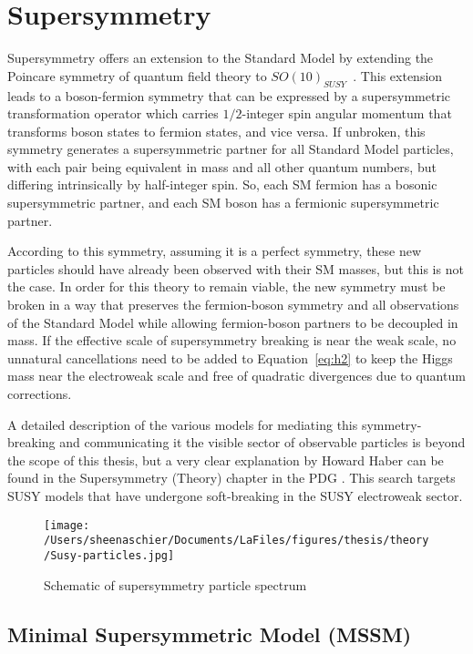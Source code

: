 \section{Supersymmetry}
\label{sec:susy}
Supersymmetry offers an extension to the Standard Model by extending the Poincare symmetry of quantum field theory to $SO(10)_{SUSY}$~\cite{Martin:1997ns}.  This extension leads to a boson-fermion symmetry that can be expressed by a supersymmetric transformation operator which carries $1/2$-integer spin angular momentum that transforms boson states to fermion states, and vice versa.  If unbroken, this symmetry generates a supersymmetric partner for all Standard Model particles, with each pair being equivalent in mass and all other quantum numbers, but differing intrinsically by half-integer spin.  So, each SM fermion has a bosonic supersymmetric partner, and each SM boson has a fermionic supersymmetric partner.  

According to this symmetry, assuming it is a perfect symmetry, these new particles should have already been observed with their SM masses, but this is not the case.  In order for this theory to remain viable, the new symmetry must be broken in a way that preserves the fermion-boson symmetry and all observations of the Standard Model while allowing fermion-boson partners to be decoupled in mass.  If the effective scale of supersymmetry breaking is near the weak scale, no unnatural cancellations need to be added to Equation~\ref{eq:h2} to keep the Higgs mass near the electroweak scale and free of quadratic divergences due to quantum corrections.  

A detailed description of the various models for mediating this symmetry-breaking and communicating it the visible sector of observable particles is beyond the scope of this thesis, but a very clear explanation by Howard Haber can be found in the Supersymmetry (Theory) chapter in the PDG \cite{haber}.   This search targets SUSY models that have undergone soft-breaking in the SUSY electroweak sector. 

  \begin{figure}[tbp]
    \centering
 \texttt{[image: /Users/sheenaschier/Documents/LaFiles/figures/thesis/theory/Susy-particles.jpg]}
    \caption{Schematic of supersymmetry particle spectrum}
   \label{fig:susy}
 \end{figure}

\subsection{Minimal Supersymmetric Model (MSSM)}

